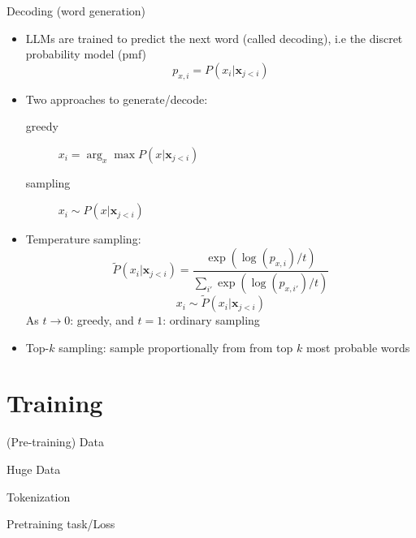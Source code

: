\documentclass[10pt]{beamer}
\begin{document}
\begin{frame}{Decoding (word generation)}

\begin{itemize}
\item LLMs are trained to predict the next word (called decoding), i.e the discret probability model (pmf)
\[
p_{x,i} = P(x_i|\mathbf{x}_{j<i})
\]
\item Two approaches to generate/decode:
\begin{description}
\item[greedy] $x_i = \arg_x \max P(x|\mathbf{x}_{j<i})$
\item[sampling] $x_i \sim P(x|\mathbf{x}_{j<i})$
\end{description}
\item Temperature sampling:
\[
\tilde{P}(x_i|\mathbf{x}_{j<i}) = \frac{\exp(\log(p_{x,i})/t)}{\sum_{i'} \exp(\log(p_{x,i'})/t)}
\]
\[
x_i \sim \tilde{P}(x_i|\mathbf{x}_{j<i})
\]
As $t\rightarrow 0$: greedy, and $t = 1$: ordinary sampling
\item Top-$k$ sampling: sample proportionally from from top $k$ most probable words
\end{itemize}

\end{frame}



\section{Training}

\begin{frame}{(Pre-training) Data}


\end{frame}


\begin{frame}{Huge Data}


\end{frame}



\begin{frame}{Tokenization}


\end{frame}

\begin{frame}{Pretraining task/Loss}


\end{frame}
\end{document}
